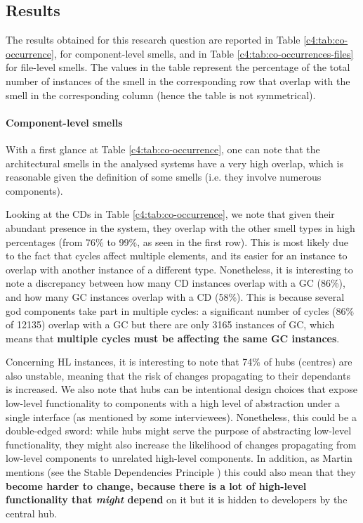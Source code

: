 \subsection{Results}\label{c4:sec:results-rq2}
The results obtained for this research question are reported in Table \ref{c4:tab:co-occurrence}, for component-level smells, and in Table \ref{c4:tab:co-occurrences-files} for file-level smells.
The values in the table represent the percentage of the total number of instances of the smell in the corresponding row that overlap with the smell in the corresponding column (hence the table is not symmetrical).

\paragraph{Component-level smells}
With a first glance at Table \ref{c4:tab:co-occurrence}, one can note that the architectural smells in the analysed systems have a very high overlap, which is reasonable given the definition of some smells (i.e. they involve numerous components).

Looking at the CDs in Table \ref{c4:tab:co-occurrence}, we note that given their abundant presence in the system, they overlap with the other smell types in high percentages (from 76\% to 99\%, as seen in the first row). 
This is most likely due to the fact that cycles affect multiple elements, and its easier for an instance to overlap with another instance of a different type.
Nonetheless, it is interesting to note a discrepancy between how many CD instances overlap with a GC (86\%), and how many GC instances overlap with a CD (58\%). This is because several god components take part in multiple cycles: a significant number of cycles (86\% of 12135) overlap with a GC but there are only 3165 instances of GC, which means that \textbf{multiple cycles must be affecting the same GC instances}. 

Concerning HL instances, it is interesting to note that 74\% of hubs (centres) are also unstable, meaning that the risk of changes propagating to their dependants is increased. 
We also note that hubs can be intentional design choices that expose low-level functionality to components with a high level of abstraction under a single interface (as mentioned by some interviewees).
Nonetheless, this could be a double-edged sword: while hubs might serve the purpose of abstracting low-level functionality, they might also increase the likelihood of changes propagating from low-level components to unrelated high-level components.
In addition, as Martin mentions (see the Stable Dependencies Principle \cite{Martin2018}) this could also mean that they \textbf{become harder to change, because there is a lot of high-level functionality that \emph{might} depend} on it but it is hidden to developers by the central hub.

